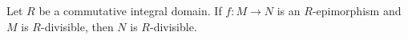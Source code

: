 Let $R$ be a commutative integral domain. If $f: M \rightarrow N$ is an $R$-epimorphism and $M$ is $R$-divisible, then $N$ is $R$-divisible.
